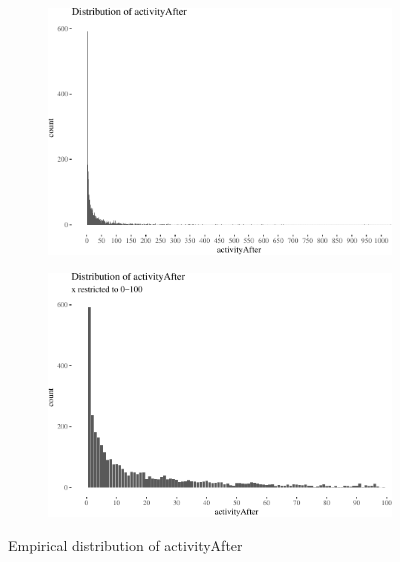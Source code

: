 \documentclass[10pt,]{scrartcl}
\begin{document}
\begin{figure}
\begin{subfigure}[b]{0.45\textwidth}

\begin{center}\includegraphics[width=1\linewidth]{redditAnalysisWalkthrough_files/figure-latex/unnamed-chunk-67-1} \end{center}
\end{subfigure}
\begin{subfigure}[b]{0.45\textwidth}

\begin{center}\includegraphics[width=1\linewidth]{redditAnalysisWalkthrough_files/figure-latex/unnamed-chunk-68-1} \end{center}
\end{subfigure}
\caption{Empirical distribution of activityAfter}
\label{fig:activityDistro}
\end{figure}
\end{document}
